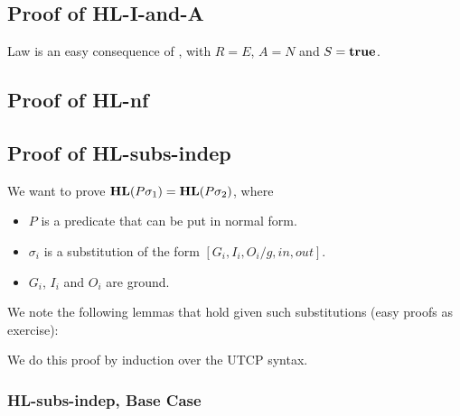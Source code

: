 \subsection{Proof of \textsf{HL-I-and-A}}

Law  is an easy consequence of ,
with $R=E$, $A=N$ and $S=\mathbf{true}$.

\subsection{Proof of \textsf{HL-nf}}



\subsection{Proof of \textsf{HL-subs-indep}}

We want to prove $\mathbf{HL}(P\sigma_1)=\mathbf{HL}(P\sigma_2)$, where
\begin{itemize}
  \item $P$ is a predicate that can be put in normal form.
  \item $\sigma_i$ is a substitution of the form $[G_i,I_i,O_i/g,in,out]$.
  \item $G_i$, $I_i$ and $O_i$ are ground.
\end{itemize}
We note the following lemmas that hold given such substitutions
(easy proofs as exercise):

We do this proof by induction over the UTCP syntax.

\subsubsection{\textsf{HL-subs-indep}, Base Case}

